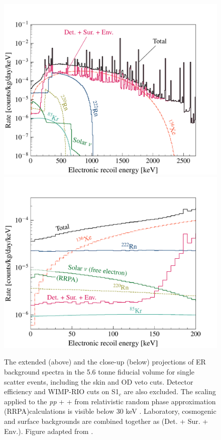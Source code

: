 %
\begin{figure}[t!]
    \centering
    \includegraphics[scale=0.5]{Chapter_5/Figures/er_background_spectrum.pdf}
    \includegraphics[scale=0.5]{Chapter_5/Figures/er_background_spectrum_zoomed.pdf}
    \caption[The extended (above) and the close-up (below) projections of ER background spectra in the 5.6 tonne fiducial volume for single scatter events, including the skin and OD veto cuts.]%
    {The extended (above) and the close-up (below) projections of ER background spectra in the 5.6 tonne fiducial volume for single scatter events, including the skin and OD veto cuts. Detector efficiency and WIMP-RIO cuts on S1$_{c}$ are also excluded. The scaling applied to the \textit{pp} + \BeS{} + \NOT{} from relativistic random phase approximation (RRPA)calculations is visible below 30 keV \cite{Chen_2017}. Laboratory, cosmogenic and surface backgrounds are combined together as (Det. + Sur. + Env.). Figure adapted from \cite{akerib2018projected}.}
    \label{fig:lz_er_spectrum}
\end{figure}
%


